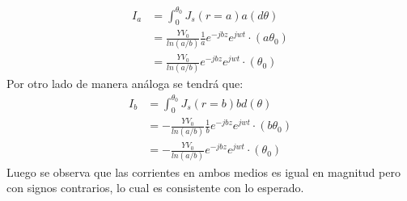 \documentclass[
  11pt,
  letterpaper,
   addpoints,
   answers
  ]{exam}
\begin{document}
\begin{questions}
\begin{solution}
\begin{enumerate}
\begin{align}
    I_{a} &= \int_{0}^{\theta_{0}} J_{s}(r=a) a(d\theta)\\
          &=\frac{YV_{0}}{ln(a/b)} \frac{1}{a} e^{-jbz}e^{jwt} \cdot (a\theta_{0})\\
          &= \frac{YV_{0}}{ln(a/b)}  e^{-jbz}e^{jwt} \cdot (\theta_{0})\
\end{align}
Por otro lado de manera análoga se tendrá que:
\begin{align}
    I_{b} &= \int_{0}^{\theta_{0}} J_{s}(r=b) b d(\theta)\\
          &= - \frac{YV_{0}}{ln(a/b)} \frac{1}{b} e^{-jbz}e^{jwt} \cdot (b\theta_{0})\\
          &= -\frac{YV_{0}}{ln(a/b)}  e^{-jbz}e^{jwt} \cdot (\theta_{0})\
\end{align}
Luego se observa que las corrientes en ambos medios es igual en magnitud pero con signos contrarios, lo cual es consistente con lo esperado.


\end{enumerate}
\end{solution}
\end{questions}
\end{document}
